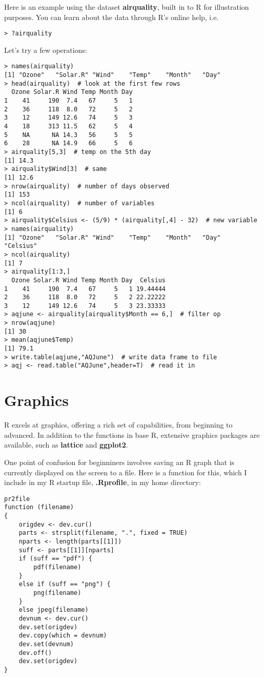 Here is an example using the dataset {\bf airquality}, built in to R for
illustration purposes.  You can learn about the data through R's online
help, i.e.

\begin{lstlisting}
> ?airquality
\end{lstlisting}

Let's try a few operations:

\begin{lstlisting}
> names(airquality)
[1] "Ozone"   "Solar.R" "Wind"    "Temp"    "Month"   "Day"
> head(airquality)  # look at the first few rows
  Ozone Solar.R Wind Temp Month Day
1    41     190  7.4   67     5   1
2    36     118  8.0   72     5   2
3    12     149 12.6   74     5   3
4    18     313 11.5   62     5   4
5    NA      NA 14.3   56     5   5
6    28      NA 14.9   66     5   6
> airquality[5,3]  # temp on the 5th day
[1] 14.3
> airquality$Wind[3]  # same
[1] 12.6
> nrow(airquality)  # number of days observed
[1] 153
> ncol(airquality)  # number of variables
[1] 6
> airquality$Celsius <- (5/9) * (airquality[,4] - 32)  # new variable
> names(airquality)
[1] "Ozone"   "Solar.R" "Wind"    "Temp"    "Month"   "Day"     "Celsius"
> ncol(airquality)
[1] 7
> airquality[1:3,]
  Ozone Solar.R Wind Temp Month Day  Celsius
1    41     190  7.4   67     5   1 19.44444
2    36     118  8.0   72     5   2 22.22222
3    12     149 12.6   74     5   3 23.33333
> aqjune <- airquality[airquality$Month == 6,]  # filter op
> nrow(aqjune)
[1] 30
> mean(aqjune$Temp)
[1] 79.1
> write.table(aqjune,"AQJune")  # write data frame to file
> aqj <- read.table("AQJune",header=T)  # read it in
\end{lstlisting}

\section{Graphics}

R excels at graphics, offering a rich set of capabilities, from
beginning to advanced.  In addition to the functions in base R,
extensive graphics packages are available, such as {\bf lattice} and
{\bf ggplot2}.

One point of confusion for beginniners involves saving an R graph that
is currently displayed on the screen to a file.  Here is a function for
this, which I include in my R startup file, {\bf .Rprofile}, in my home
directory:

\begin{lstlisting}
pr2file
function (filename)
{
    origdev <- dev.cur()
    parts <- strsplit(filename, ".", fixed = TRUE)
    nparts <- length(parts[[1]])
    suff <- parts[[1]][nparts]
    if (suff == "pdf") {
        pdf(filename)
    }
    else if (suff == "png") {
        png(filename)
    }
    else jpeg(filename)
    devnum <- dev.cur()
    dev.set(origdev)
    dev.copy(which = devnum)
    dev.set(devnum)
    dev.off()
    dev.set(origdev)
}
\end{lstlisting}

